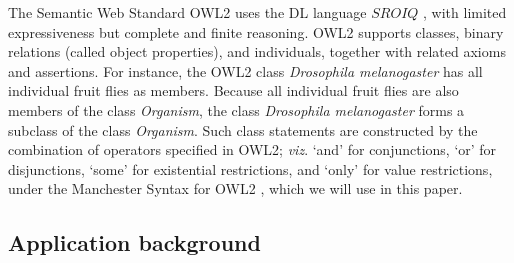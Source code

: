 The Semantic Web Standard OWL2 \citep{W3C2012} uses the DL language $SROIQ$ \citep{Horrocks2006}, with limited expressiveness but complete and finite reasoning. OWL2 supports classes, binary relations (called object properties), and individuals, together with related axioms and assertions. For instance, the OWL2 class \textit{Drosophila melanogaster} has all individual fruit flies as members. Because all individual fruit flies are also members of the class \textit{Organism}, the class  \textit{Drosophila melanogaster} forms a subclass of the class \textit{Organism}. 
Such class statements are constructed  by the combination  of operators specified in OWL2; \emph{viz}. `and' for conjunctions, `or' for disjunctions, `some' for existential restrictions, and `only' for value restrictions, under the Manchester Syntax for OWL2 \citep{Horridge2009}, which we will use in this paper. 



%
%

\subsection*{Application background}

